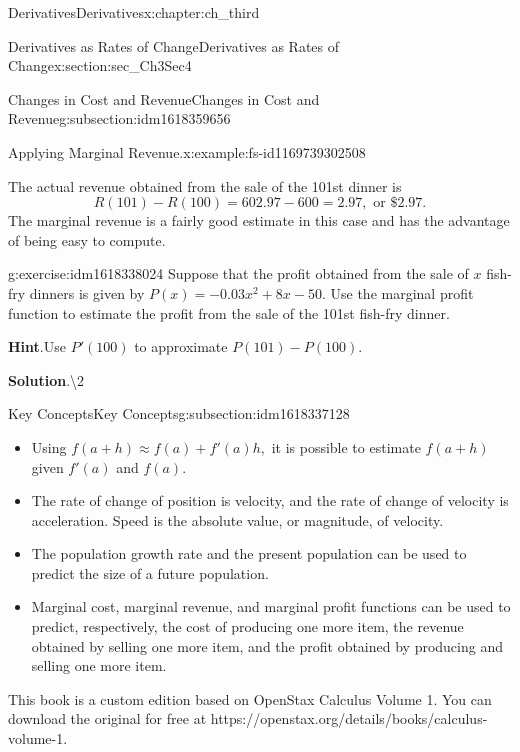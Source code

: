 \documentclass[oneside,10pt,]{book}
\newcommand{\blocktitlefont}{\relax}
\numberwithin{equation}{section}
\begin{document}
\begin{chapterptx}{Derivatives}{}{Derivatives}{}{}{x:chapter:ch_third}
\begin{sectionptx}{Derivatives as Rates of Change}{}{Derivatives as Rates of Change}{}{}{x:section:sec_Ch3Sec4}
\begin{subsectionptx}{Changes in Cost and Revenue}{}{Changes in Cost and Revenue}{}{}{g:subsection:idm1618359656}
\begin{example}{Applying Marginal Revenue.}{x:example:fs-id1169739302508}
\par
The actual revenue obtained from the sale of the 101st dinner is%
%
\begin{equation*}
R(101)-R(100)=602.97-600=2.97,\text{ or } \$2.97.
\end{equation*}
The marginal revenue is a fairly good estimate in this case and has the advantage of being easy to compute.%
\end{example}
\begin{inlineexercise}{}{g:exercise:idm1618338024}%
Suppose that the profit obtained from the sale of \(x\) fish-fry dinners is given by \(P(x)=-0.03x^2+8x-50.\) Use the marginal profit function to estimate the profit from the sale of the 101st fish-fry dinner.%
\par\smallskip%
\noindent\textbf{\blocktitlefont Hint}.\hypertarget{g:hint:idm1618339560}{}\quad{}Use \(P'(100)\) to approximate \(P(101)-P(100).\)%
\par\smallskip%
\noindent\textbf{\blocktitlefont Solution}.\hypertarget{g:solution:idm1618337768}{}\quad{}\textbackslash{}\textdollar{}2%
\end{inlineexercise}%
\end{subsectionptx}
%
%
\typeout{************************************************}
\typeout{************************************************}
%
\begin{subsectionptx}{Key Concepts}{}{Key Concepts}{}{}{g:subsection:idm1618337128}
%
\begin{itemize}[label=\textbullet]
\item{}Using \(f(a+h)\approx f(a)+f'(a)h,\) it is possible to estimate \(f(a+h)\) given \(f'(a)\) and \(f(a).\)%
\item{}The rate of change of position is velocity, and the rate of change of velocity is acceleration. Speed is the absolute value, or magnitude, of velocity.%
\item{}The population growth rate and the present population can be used to predict the size of a future population.%
\item{}Marginal cost, marginal revenue, and marginal profit functions can be used to predict, respectively, the cost of producing one more item, the revenue obtained by selling one more item, and the profit obtained by producing and selling one more item.%
\end{itemize}
\end{subsectionptx}
This book is a custom edition based on OpenStax Calculus Volume 1. You can download the original for free at https:\slash{}\slash{}openstax.org\slash{}details\slash{}books\slash{}calculus-volume-1.%

\end{sectionptx}
\end{chapterptx}
\end{document}
